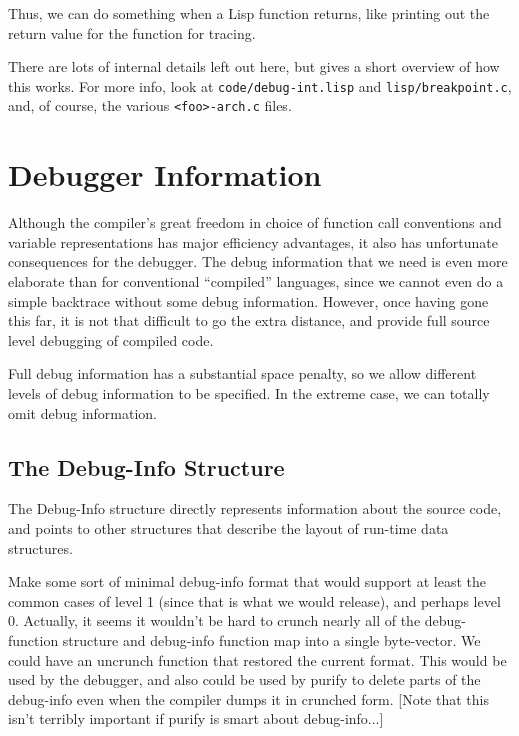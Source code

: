 Thus, we can do something when a Lisp function returns, like printing
out the return value for the function for tracing.

There are lots of internal details left out here, but gives a short
overview of how this works.  For more info, look at
\verb+code/debug-int.lisp+ and \verb+lisp/breakpoint.c+, and, of
course, the various \verb+<foo>-arch.c+ files.

\chapter{Debugger Information}
\label{debug-info}

Although the compiler's great freedom in choice of function call conventions
and variable representations has major efficiency advantages, it also has
unfortunate consequences for the debugger.  The debug information that we need
is even more elaborate than for conventional ``compiled'' languages, since we
cannot even do a simple backtrace without some debug information.  However,
once having gone this far, it is not that difficult to go the extra distance,
and provide full source level debugging of compiled code.

Full debug information has a substantial space penalty, so we allow different
levels of debug information to be specified.  In the extreme case, we can
totally omit debug information.

\section{The Debug-Info Structure}

The Debug-Info structure directly represents information about the
source code, and points to other structures that describe the layout of
run-time data structures.


Make some sort of minimal debug-info format that would support at least the
common cases of level 1 (since that is what we would release), and perhaps
level 0.  Actually, it seems it wouldn't be hard to crunch nearly all of the
debug-function structure and debug-info function map into a single byte-vector.
We could have an uncrunch function that restored the current format.  This
would be used by the debugger, and also could be used by purify to delete parts
of the debug-info even when the compiler dumps it in crunched form.
[Note that this isn't terribly important if purify is smart about
debug-info...]


